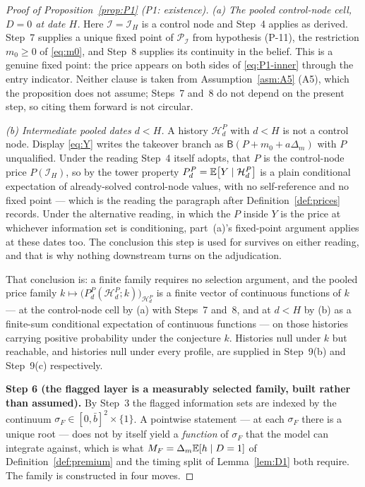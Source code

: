 \begin{proof}[Proof of Proposition~\ref{prop:P1} (P1: existence)]
\emph{(a) The pooled control-node cell, $D = 0$ at date $H$.} Here $\mathcal I = \mathcal I_H$ is a
control node and Step~4 applies as derived. Step~7 supplies a unique fixed point of
$\mathcal P_{\mathcal I}$ from hypothesis (P-11), the restriction $m_0 \ge 0$ of \eqref{eq:m0}, and
Step~8 supplies its continuity in the belief. This is a genuine fixed point: the price appears on
both sides of \eqref{eq:P1-inner} through the entry indicator. Neither clause is taken from
Assumption~\ref{asm:A5} (A5), which the proposition does not assume; Steps~7 and~8 do not depend on the
present step, so citing them forward is not circular.

\emph{(b) Intermediate pooled dates $d < H$.} A history $\mathcal H_d^P$ with $d < H$ is not a
control node. Display \eqref{eq:Y} writes the takeover branch as $\mathsf B(P+m_0+a\Delta_m)$ with
$P$ unqualified. Under the reading Step~4 itself adopts, that $P$ is the control-node price
$P(\mathcal I_H)$, so by the tower property
$P_d^P = \mathbb{E}\bigl[Y \mid \mathcal H_d^P\bigr]$ is a plain conditional expectation of
already-solved control-node values, with no self-reference and no fixed point --- which is the
reading the paragraph after Definition~\ref{def:prices} records. Under the alternative reading, in
which the $P$ inside $Y$ is the price at whichever information set is conditioning, part~(a)'s
fixed-point argument applies at these dates too. The conclusion this step is used for survives on
either reading, and that is why nothing downstream turns on the adjudication.

That conclusion is: a finite family requires no selection argument, and the pooled price family
$k \mapsto \bigl(P_d^P(\mathcal H_d^P;k)\bigr)_{\mathcal H_d^P}$ is a finite vector of continuous
functions of $k$ --- at the control-node cell by (a) with Steps~7 and~8, and at $d < H$ by (b) as a
finite-sum conditional expectation of continuous functions --- on those histories carrying positive
probability under the conjecture $k$. Histories null under $k$ but reachable, and histories null
under every profile, are supplied in Step~9(b) and Step~9(c) respectively.

\smallskip
\noindent\textbf{Step 6 (the flagged layer is a measurably selected family, built rather than
assumed).}
By Step~3 the flagged information sets are indexed by the continuum $\sigma_F \in [0,\bar b]^2 \times
\{1\}$. A pointwise statement --- at each $\sigma_F$ there is a unique root --- does not by itself
yield a \emph{function} of $\sigma_F$ that the model can integrate against, which is what
$M_F = \Delta_m\mathbb{E}[h \mid D=1]$ of Definition~\ref{def:premium} and the timing split of
Lemma~\ref{lem:D1} both require. The family is constructed in four moves.


\end{proof}

